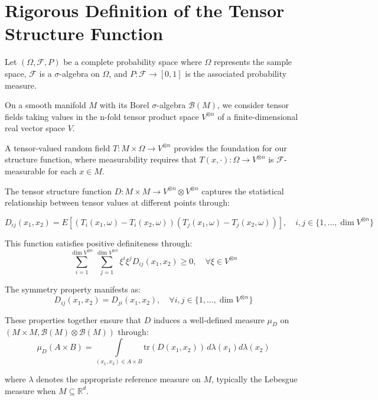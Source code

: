 \documentclass{article}
\begin{document}
\section{Rigorous Definition of the Tensor Structure Function}

Let $(\Omega, \mathcal{F}, P)$ be a complete probability space where $\Omega$ represents the sample space, $\mathcal{F}$ is a $\sigma$-algebra on $\Omega$, and $P: \mathcal{F} \to [0,1]$ is the associated probability measure.

On a smooth manifold $M$ with its Borel $\sigma$-algebra $\mathcal{B}(M)$, we consider tensor fields taking values in the n-fold tensor product space $V^{\otimes n}$ of a finite-dimensional real vector space $V$.

A tensor-valued random field $T: M \times \Omega \to V^{\otimes n}$ provides the foundation for our structure function, where measurability requires that $T(x,\cdot): \Omega \to V^{\otimes n}$ is $\mathcal{F}$-measurable for each $x \in M$.

The tensor structure function $D: M \times M \to V^{\otimes n} \otimes V^{\otimes n}$ captures the statistical relationship between tensor values at different points through:

\begin{equation}
D_{ij}(x_1,x_2) = E[(T_i(x_1,\omega) - T_i(x_2,\omega))(T_j(x_1,\omega) - T_j(x_2,\omega))], \quad i,j \in \{1,\ldots,\dim V^{\otimes n}\}
\end{equation}

This function satisfies positive definiteness through:
\begin{equation}
\sum_{i=1}^{\dim V^{\otimes n}} \sum_{j=1}^{\dim V^{\otimes n}} \xi^i\xi^jD_{ij}(x_1,x_2) \geq 0, \quad \forall \xi \in V^{\otimes n}
\end{equation}

The symmetry property manifests as:
\begin{equation}
D_{ij}(x_1,x_2) = D_{ji}(x_1,x_2), \quad \forall i,j \in \{1,\ldots,\dim V^{\otimes n}\}
\end{equation}

These properties together ensure that $D$ induces a well-defined measure $\mu_D$ on $(M \times M, \mathcal{B}(M) \otimes \mathcal{B}(M))$ through:
\begin{equation}
\mu_D(A \times B) = \int\limits_{(x_1,x_2) \in A \times B} \text{tr}(D(x_1,x_2)) \, d\lambda(x_1)d\lambda(x_2)
\end{equation}

where $\lambda$ denotes the appropriate reference measure on $M$, typically the Lebesgue measure when $M \subseteq \mathbb{R}^d$.
\end{document}
